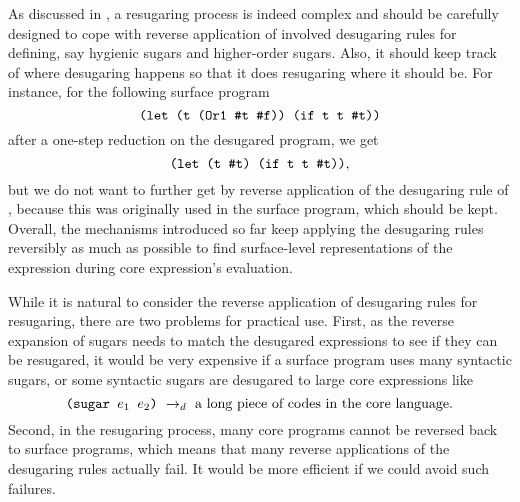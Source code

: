 As discussed in \cite{resugaring,hygienic}, a resugaring process is indeed complex and should be carefully designed to cope with reverse application of involved desugaring rules for defining, say hygienic sugars and higher-order sugars. Also, it should keep track of where desugaring happens so that it does resugaring where it should be. For instance, for the following surface program
\[
\texttt{(let (t (Or1 \#t \#f)) (if t t \#t))}
\]
after a one-step reduction on the desugared program, we get
\[
\texttt{(let (t \#t) (if t t \#t))},
\]
but we do not want to further get  by reverse application of the desugaring rule of , because this  was originally used in the surface program, which should be kept.
Overall, the mechanisms introduced so far keep applying the desugaring rules reversibly as much as possible to find surface-level representations of the expression during core expression's evaluation.

While it is natural to consider the reverse application of desugaring rules for resugaring, there are two problems for practical use. First, as the reverse expansion of sugars needs to match the desugared expressions to see if they can be resugared, it would be very expensive if a surface program uses many syntactic sugars, or some syntactic sugars are desugared to large core expressions like
\[
\texttt{(sugar $e_1$ $e_2$)} ~\rightarrow_d~ \mbox{a long piece of codes in the core language}.
\]
Second, in the resugaring process, many core programs cannot be reversed back to surface programs, which means that many reverse applications of the desugaring rules actually fail. It would be more efficient if we could avoid such failures.




